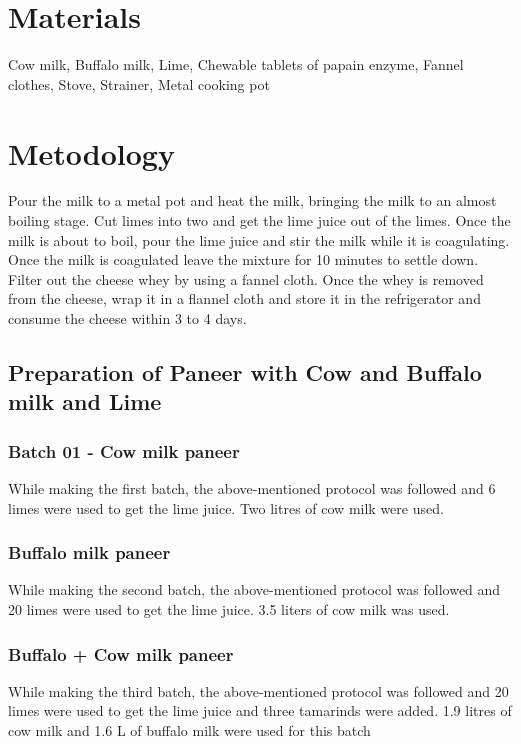 \documentclass[12pt]{article}
\begin{document}
	




	
	
	\section{Materials}
	\label{sec:materials}
	
	Cow milk, Buffalo milk, Lime, Chewable tablets of papain enzyme, Fannel clothes, Stove, Strainer, Metal cooking pot

	
	\section{Metodology}
	\label{sec:metodology}
	
	Pour the milk to a metal pot and heat the milk,  bringing the milk to an almost boiling stage. Cut limes into two and get the lime juice out of the limes. Once the milk is about to boil, pour the lime juice and stir the milk while it is coagulating. Once the milk is coagulated leave the mixture for 10 minutes to settle down. Filter out the cheese whey by using a fannel cloth. Once the whey is removed from the cheese, wrap it in a flannel cloth and store it in the refrigerator and consume the cheese within 3 to 4 days.

 
\subsection{Preparation of  Paneer with Cow and Buffalo milk and Lime}

\subsubsection{Batch 01 - Cow milk paneer
}
 
 While making the first batch, the above-mentioned protocol was followed and 6 limes were used to get the lime juice. Two litres of cow milk were used. 

    \subsubsection{ Buffalo milk paneer}


While making the second batch, the above-mentioned protocol was followed and 20 limes were used to get the lime juice. 3.5  liters of cow milk was used. 

\subsubsection{Buffalo + Cow milk paneer }
While making the third batch, the above-mentioned protocol was followed and 20 limes were used to get the lime juice and three tamarinds were added. 1.9 litres of cow milk and 1.6 L of buffalo milk were used for this batch
\end{document}
